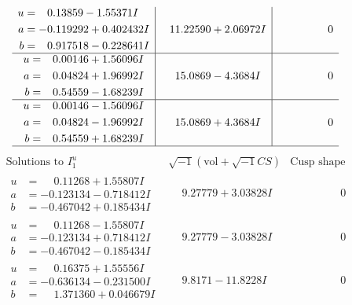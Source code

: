 \documentclass[1p]{elsarticle_modified}
\theoremstyle{definition}
\newcommand{\I}{\sqrt{-1}}
\begin{document}
$$\begin{array}{c|c|c}
\begin{aligned}
u &= \phantom{-}0.13859 - 1.55371 I \\
a &= -0.119292 + 0.402432 I \\
b &= \phantom{-}0.917518 - 0.228641 I\end{aligned}
 & \phantom{-}11.22590 + 2.06972 I & \phantom{-0.000000 } 0 \\ \hline\begin{aligned}
u &= \phantom{-}0.00146 + 1.56096 I \\
a &= \phantom{-}0.04824 + 1.96992 I \\
b &= \phantom{-}0.54559 - 1.68239 I\end{aligned}
 & \phantom{-}15.0869 - 4.3684 I & \phantom{-0.000000 } 0 \\ \hline\begin{aligned}
u &= \phantom{-}0.00146 - 1.56096 I \\
a &= \phantom{-}0.04824 - 1.96992 I \\
b &= \phantom{-}0.54559 + 1.68239 I\end{aligned}
 & \phantom{-}15.0869 + 4.3684 I & \phantom{-0.000000 } 0\\
 \hline 
 \end{array}$$\newpage$$\begin{array}{c|c|c}  
\text{Solutions to }I^u_{1}& \I (\text{vol} + \sqrt{-1}CS) & \text{Cusp shape}\\
 \hline 
\begin{aligned}
u &= \phantom{-}0.11268 + 1.55807 I \\
a &= -0.123134 - 0.718412 I \\
b &= -0.467042 + 0.185434 I\end{aligned}
 & \phantom{-}9.27779 + 3.03828 I & \phantom{-0.000000 } 0 \\ \hline\begin{aligned}
u &= \phantom{-}0.11268 - 1.55807 I \\
a &= -0.123134 + 0.718412 I \\
b &= -0.467042 - 0.185434 I\end{aligned}
 & \phantom{-}9.27779 - 3.03828 I & \phantom{-0.000000 } 0 \\ \hline\begin{aligned}
u &= \phantom{-}0.16375 + 1.55556 I \\
a &= -0.636134 - 0.231500 I \\
b &= \phantom{-}1.371360 + 0.046679 I\end{aligned}
 & \phantom{-}9.8171 - 11.8228 I & \phantom{-0.000000 } 0 \\ \hline\begin{aligned}

\end{aligned}
\end{array}$$
\end{document}
